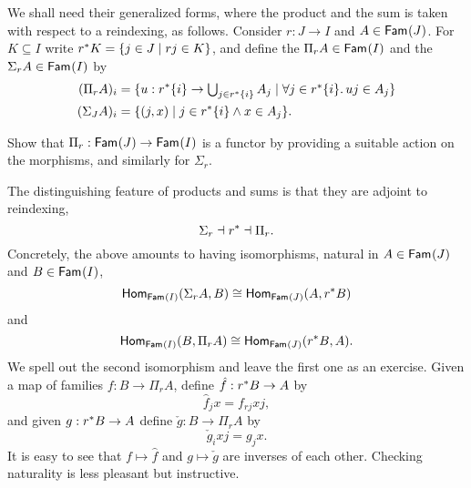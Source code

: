 We shall need their generalized forms, where the product and the sum is taken with respect to a reindexing, as follows.
%
Consider $r : J \to I$ and $A \in \Fam{J}$. For $K \subseteq I$ write $\invim{r} K = \set{ j \in J \such r j \in K}$, and define the  $\Pi_r A \in \Fam{I}$ and the  $\Sigma_r A \in \Fam{I}$ by
%
\begin{align}
  \label{eq:pi-r}
  (\Pi_r A)_i &=
    \set{ u : \invim{r} \set{i} \to \textstyle\bigcup_{j \in \invim{r} \set{i}} A_j
            \such \all{j \in \invim{r} \set{i}} u j \in A_j
    }
  \\
  \notag
  (\Sigma_J A)_i &= \set{ (j, x) \such j \in \invim{r} \set{i} \land x \in A_j }.
\end{align}
%

\begin{exercise}
  Show that $\Pi_r : \Fam{J} \to \Fam{I}$ is a functor by providing a suitable action on the morphisms, and similarly for $\Sigma_r$.
\end{exercise}





The distinguishing feature of products and sums is that they are adjoint to reindexing,
%
\begin{equation*}
  \Sigma_r \dashv \invim{r} \dashv \Pi_r.
\end{equation*}
%
Concretely, the above amounts to having isomorphisms, natural in $A \in \Fam{J}$ and $B \in \Fam{I}$,
%
\begin{equation*}
  \Hom[\Fam{I}]{\Sigma_r A, B}
  \cong
  \Hom[\Fam{J}]{A, \invim{r} B}
\end{equation*}
%
and
%
\begin{equation*}
  \Hom[\Fam{I}]{B, \Pi_r A}
  \cong
  \Hom[\Fam{J}]{\invim{r} B, A}.
\end{equation*}
%
We spell out the second isomorphism and leave the first one as an exercise.
%
Given a map of families $f : B \to \Pi_r A$, define $\hat{f} : \invim{r} B \to A$ by
%
\begin{equation}
  \label{eq:sub-adj-pi-hat}
  \hat{f}_j x = f_{r j} x j,
\end{equation}
%
and given $g : \invim{r} B \to A$ define $\check{g} : B \to \Pi_r A$ by 
%
\begin{equation}
  \label{eq:sub-adj-pi-check}
  \check{g}_i x j = g_j x.
\end{equation}
%
It is easy to see that $f \mapsto \hat{f}$ and $g \mapsto \check{g}$ are inverses of each other. Checking naturality is less pleasant but instructive.

